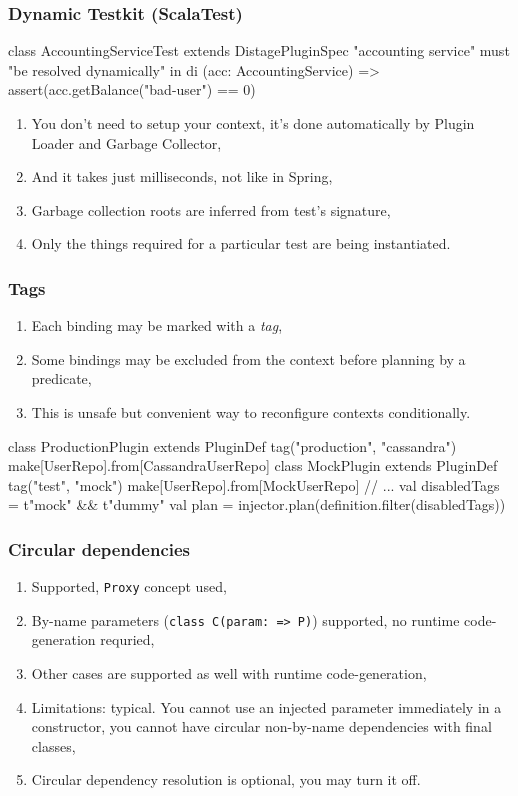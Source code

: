 \documentclass[usenames,dvipsnames]{beamer}
\begin{document}
\begin{frame}[fragile]
\frametitle{Dynamic Testkit (ScalaTest)}
\begin{scalacode}
class AccountingServiceTest extends DistagePluginSpec {
  "accounting service" must {
    "be resolved dynamically" in di {
      (acc: AccountingService) =>
        assert(acc.getBalance("bad-user") == 0)
    }
  }
}
\end{scalacode}

\begin{enumerate}
\item You don't need to setup your context, it's done automatically by Plugin Loader and Garbage Collector,
\item And it takes just milliseconds, not like in Spring,
\item Garbage collection roots are inferred from test's signature,
\item Only the things required for a particular test are being instantiated.
\end{enumerate}
\end{frame}

\begin{frame}[fragile]
\frametitle{Tags}
\begin{enumerate}
\item Each binding may be marked with a \textit{tag},
\item Some bindings may be excluded from the context before planning by a predicate,
\item This is unsafe but convenient way to reconfigure contexts conditionally.
\end{enumerate}

\begin{scalacode}
class ProductionPlugin extends PluginDef {
  tag("production", "cassandra")
  make[UserRepo].from[CassandraUserRepo]
}
class MockPlugin extends PluginDef {
  tag("test", "mock")
  make[UserRepo].from[MockUserRepo]
}
// ...
val disabledTags = t"mock" && t"dummy"
val plan = injector.plan(definition.filter(disabledTags))
\end{scalacode}

\end{frame}

\begin{frame}
\frametitle{Circular dependencies}
\begin{enumerate}
\item Supported, \texttt{Proxy} concept used,
\item By-name parameters (\texttt{class C(param: => P)}) supported, no runtime code-generation requried,
\item Other cases are supported as well with runtime code-generation,
\item Limitations: typical. You cannot use an injected parameter immediately in a constructor, 
   you cannot have circular non-by-name dependencies with final classes,
\item Circular dependency resolution is optional, you may turn it off.
\end{enumerate}
\end{frame}
\end{document}
